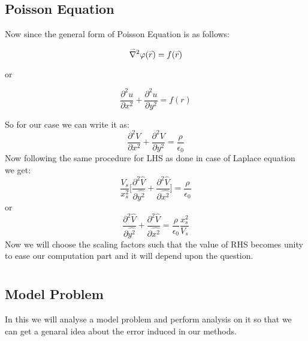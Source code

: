 \documentclass[letterpaper,11pt]{article}
\newcommand{\newsection}[1]{\section{\sffamily{\bfseries{#1}}}}
\newcommand{\myvec}[1]{\accentset{\rightharpoonup}{#1}}
\begin{document}
	\subsection{Poisson Equation}
	\noindent
	Now since the general form of Poisson Equation is as follows:
	\begin{center}
		$$\myvec{\nabla}^2 \varphi(\myvec{r}) =  f(\myvec{r})$$
	\end{center}
	\noindent
	or 
	\begin{center}
		\[  
		\frac{\partial^2 u}{\partial x^2} + \frac{\partial^2 u}{\partial y^2} =  f({r})
		\]
	\end{center}
	
	So for our case we can write it as:
	\[  
	\frac{\partial^2 V}{\partial x^2} + \frac{\partial^2 V}{\partial y^2} =  \frac{\rho}{\epsilon_0}
	\]
	Now following the same procedure  for LHS as done in case of Laplace equation we get:
		\[  \frac{V_s}{x_s^2} \Big[{\frac{\partial^2 \hat{V}}{\partial \hat{y^2}}} +  {\frac{\partial^2 \hat{V}}{\partial \hat{x^2}}}\Big] =   \frac{\rho}{\epsilon_0} \]
	or
		\[  {\frac{\partial^2 \hat{V}}{\partial \hat{y^2}}} +  {\frac{\partial^2 \hat{V}}{\partial \hat{x^2}}} =   \frac{\rho}{\epsilon_0} \frac{x_s^2}{V_s} \]
		Now we will choose the scaling factors such that the value of RHS becomes unity to ease our computation part and it will depend upon the question.
		
		\newpage
		\newsection {Error Analysis }
		\subsection{Model Problem}
		In this we will analyse a model problem and perform analysis on it so that we can get a genaral idea about the  error induced in our methods.
\end{document}
